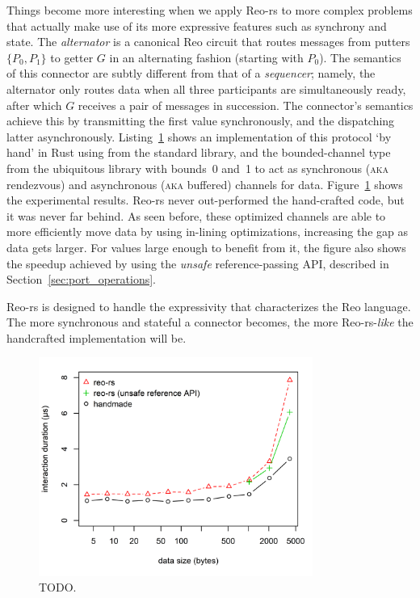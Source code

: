 Things become more interesting when we apply Reo-rs to more complex problems that actually make use of its more expressive features such as synchrony and state. The \textit{alternator} is a canonical Reo circuit that routes messages from putters $\{P_0, P_1\}$ to getter $G$ in an alternating fashion (starting with $P_0$). The semantics of this connector are subtly different from that of a \textit{sequencer}; namely, the alternator only routes data when all three participants are simultaneously ready, after which $G$ receives a pair of messages in succession. The connector's semantics achieve this by transmitting the first value synchronously, and the dispatching latter asynchronously.
Listing~\ref{fig:alternator} shows an implementation of this protocol `by hand' in Rust using  from the standard library, and the bounded-channel type from the ubiquitous  library with bounds~0 and~1 to act as synchronous (\textsc{aka} rendezvous) and asynchronous (\textsc{aka} buffered) channels for data. Figure~\ref{fig:alternator} shows the experimental results. Reo-rs never out-performed the hand-crafted code, but it was never far behind. As seen before, these optimized channels are able to more efficiently move data by using in-lining optimizations, increasing the gap as data gets larger. For values large enough to benefit from it, the figure also shows the speedup achieved by using the \textit{unsafe} reference-passing API, described in Section~\ref{sec:port_operations}.

Reo-rs is designed to handle the expressivity that characterizes the Reo language. The more synchronous and stateful a connector becomes, the more Reo-rs-\textit{like} the handcrafted implementation will be.

\begin{figure}
	\centering
	\includegraphics[width=0.80\textwidth]{experiments/alternator.png}
	\caption[Hand-crafted vs.\ Reo-generated Alternator.]{TODO.}
	\label{fig:alternator}
\end{figure}

